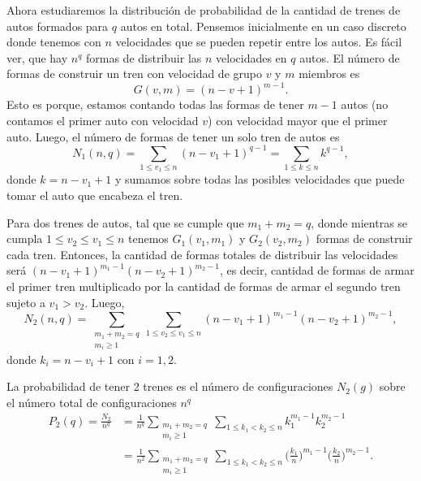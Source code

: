 \documentclass[letterpaper,12pt]{article}
\theoremstyle{plain}
\begin{document}
Ahora estudiaremos la distribución de probabilidad de la cantidad de trenes de autos formados para $q$ autos en total. Pensemos inicialmente en un caso discreto donde tenemos con $n$ velocidades que se pueden repetir entre los autos. Es fácil ver, que hay $n^q$ formas de distribuir las $n$ velocidades en $q$ autos. El número de formas de construir un tren con velocidad de grupo $v$ y $m$ miembros es 
\begin{equation}
    G(v,m) = (n - v + 1)^{m-1}.
\end{equation}
Esto es porque, estamos contando todas las formas de tener $m-1$ autos (no contamos el primer auto con velocidad $v$) con velocidad mayor que el primer auto. Luego, el número de formas de tener un solo tren de autos es
\begin{equation}
    N_1 (n,q) = \sum_{1 \leq v_1 \leq n} (n - v_1 + 1)^{q-1} = \sum_{1\leq k\leq n} k^{q-1},
\end{equation}
donde $k = n - v_1 + 1$ y sumamos sobre todas las posibles velocidades que puede tomar el auto que encabeza el tren.

Para dos trenes de autos, tal que se cumple que $m_1 + m_2 = q$, donde mientras se cumpla $1 \leq v_2 \leq v_1 \leq n$ tenemos $G_1(v_1,m_1)$ y $G_2(v_2,m_2)$ formas de construir cada tren. Entonces, la cantidad de formas totales de distribuir las velocidades será $(n - v_1 + 1)^{m_1-1}(n - v_2 + 1)^{m_2-1}$, es decir, cantidad de formas de armar el primer tren multiplicado por la cantidad de formas de armar el segundo tren sujeto a $v_1 > v_2$. Luego, 
\begin{equation}
N_2 (n,q) = \sum_{\substack{m_1 + m_2 = q \\ m_i \geq 1}} \sum_{1 \leq v_2 \leq v_1 \leq n} (n - v_1 + 1)^{m_1-1} (n - v_2 + 1)^{m_2-1}, 
\end{equation}
donde $k_i = n - v_i + 1$ con $i = 1,2$. 

La probabilidad de tener 2 trenes es el número de configuraciones $N_2(g)$ sobre el número total de configuraciones $n^q$
\begin{align}
P_2(q) = \frac{N_2}{n^q} &= \frac{1}{n^q} \sum_{\substack{m_1 + m_2 = q \\ m_i \geq 1}} \sum_{1 \leq k_1 < k_2 \leq n} k_1^{m_1-1} k_2^{m_2-1}\\
&=\frac{1}{n^2} \sum_{\substack{m_1 + m_2 = q \\ m_i \geq 1}} \sum_{1 \leq k_1 < k_2 \leq n} \biggr(\frac{k_1}{n}\biggr)^{m_1-1} \biggr(\frac{k_2}{n}\biggr)^{m_2-1}.
\end{align}
\end{document}
